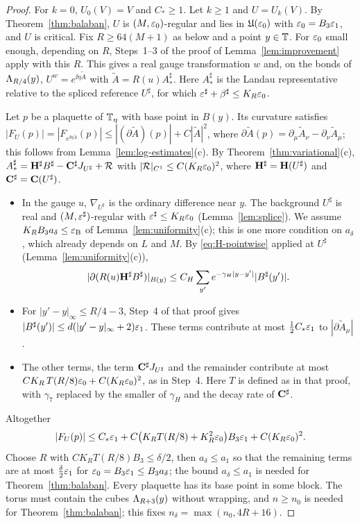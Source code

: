 \begin{proof}
For $k=0$, $U_0(V)=V$ and $C_*\ge1$. Let $k\ge1$ and $U=U_k(V)$. By Theorem~\ref{thm:balaban}, $U$ is $(M,\varepsilon_0)$-regular and lies in $\mathfrak U(\varepsilon_0)$ with $\varepsilon_0=B_3\varepsilon_1$, and $U$ is critical. Fix $R\ge64(M+1)$ as below and a point $y\in\mathbb T$. For $\varepsilon_0$ small enough, depending on $R$, Steps~1--3 of the proof of Lemma~\ref{lem:improvement} apply with this $R$. This gives a real gauge transformation $w$ and, on the bonds of $\Lambda_{R/4}(y)$, $U^w=e^{\ii\eta\tilde A}$ with $\tilde A=R(u)A^\sharp_*$. Here $A^\sharp_*$ is the Landau representative relative to the spliced reference $U^\sharp$, for which $\varepsilon^\sharp+\beta^\sharp\le K_R\varepsilon_0$.

Let $p$ be a plaquette of $\mathbb T_\eta$ with base point in $B(y)$. Its curvature satisfies $|F_U(p)|=|F_{e^{\ii\eta\tilde A}}(p)|\le|(\partial\tilde A)(p)|+C|\tilde A|^2$, where $\partial\tilde A(p)=\partial_\mu\tilde A_\nu-\partial_\nu\tilde A_\mu$; this follows from Lemma~\ref{lem:log-estimates}(c). By Theorem~\ref{thm:variational}(c), $A^\sharp_*=\mathbf H^\sharp B^\sharp-\mathbf C^\sharp J_{U^\sharp}+\mathcal R$ with $|\mathcal R|_{C^1}\le C(K_R\varepsilon_0)^2$, where $\mathbf H^\sharp=\mathbf H(U^\sharp)$ and $\mathbf C^\sharp=\mathbf C(U^\sharp)$.
\begin{itemize}
\item In the gauge $u$, $\nabla_{U^\sharp}$ is the ordinary difference near $y$. The background $U^\sharp$ is real and $(M,\varepsilon^\sharp)$-regular with $\varepsilon^\sharp\le K_R\varepsilon_0$ (Lemma~\ref{lem:splice}). We assume $K_RB_3a_\delta\le\varepsilon_{\rm B}$ of Lemma~\ref{lem:uniformity}(c); this is one more condition on $a_\delta$, which already depends on $L$ and $M$. By \eqref{eq:H-pointwise} applied at $U^\sharp$ (Lemma~\ref{lem:uniformity}(c)),
\[
|\partial(R(u)\mathbf H^\sharp B^\sharp)|_{B(y)}\le C_H\sum_{y'}e^{-\gamma_H|y-y'|}|B^\sharp(y')| .
\]
\item For $|y'-y|_\infty\le R/4-3$, Step~4 of that proof gives $|B^\sharp(y')|\le d(|y'-y|_\infty+2)\varepsilon_1$. These terms contribute at most $\frac12C_*\varepsilon_1$ to $|\partial\tilde A_\mu|$.
\item The other terms, the term $\mathbf C^\sharp J_{U^\sharp}$ and the remainder contribute at most $CK_R\,T(R/8)\varepsilon_0+C(K_R\varepsilon_0)^2$, as in Step~4. Here $T$ is defined as in that proof, with $\gamma_7$ replaced by the smaller of $\gamma_H$ and the decay rate of $\mathbf C^\sharp$.
\end{itemize}
Altogether
\[
|F_U(p)|\le C_*\varepsilon_1+C\big(K_RT(R/8)+K_R^2\varepsilon_0\big)B_3\varepsilon_1+C(K_R\varepsilon_0)^2 .
\]
Choose $R$ with $CK_RT(R/8)B_3\le\delta/2$, then $a_\delta\le a_1$ so that the remaining terms are at most $\frac\delta2\varepsilon_1$ for $\varepsilon_0=B_3\varepsilon_1\le B_3a_\delta$; the bound $a_\delta\le a_1$ is needed for Theorem~\ref{thm:balaban}. Every plaquette has its base point in some block. The torus must contain the cubes $\Lambda_{R+3}(y)$ without wrapping, and $n\ge n_0$ is needed for Theorem~\ref{thm:balaban}; this fixes $n_\delta=\max(n_0,4R+16)$.
\end{proof}

